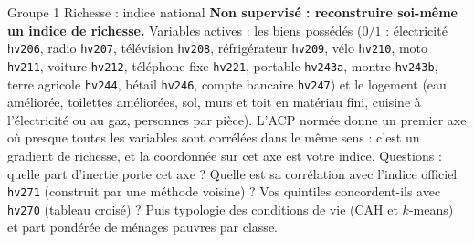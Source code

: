 \documentclass[11pt]{article}
\begin{document}
\begin{fiche}{Groupe 1 \textendash{} Richesse : indice national}
\textbf{Non supervisé : reconstruire soi-même un indice de richesse.} Variables actives : les biens possédés ($0/1$ : électricité \texttt{hv206}, radio \texttt{hv207}, télévision \texttt{hv208}, réfrigérateur \texttt{hv209}, vélo \texttt{hv210}, moto \texttt{hv211}, voiture \texttt{hv212}, téléphone fixe \texttt{hv221}, portable \texttt{hv243a}, montre \texttt{hv243b}, terre agricole \texttt{hv244}, bétail \texttt{hv246}, compte bancaire \texttt{hv247}) et le logement (eau améliorée, toilettes améliorées, sol, murs et toit en matériau fini, cuisine à l'électricité ou au gaz, personnes par pièce). L'ACP normée donne un premier axe où presque toutes les variables sont corrélées dans le même sens : c'est un gradient de richesse, et la coordonnée sur cet axe est votre indice. Questions : quelle part d'inertie porte cet axe ? Quelle est sa corrélation avec l'indice officiel \texttt{hv271} (construit par une méthode voisine) ? Vos quintiles concordent-ils avec \texttt{hv270} (tableau croisé) ? Puis typologie des conditions de vie (CAH et $k$-means) et part pondérée de ménages pauvres par classe.
\end{fiche}

\end{document}
